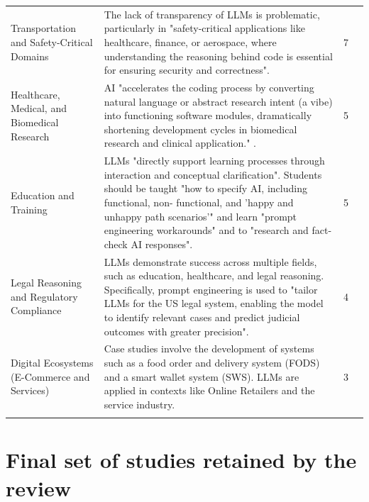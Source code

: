 {\begin{longtable}{>{\raggedright\arraybackslash} p{3cm} p{9.5cm} p{0.2cm} >{\raggedright\arraybackslash}p{1.5cm}}
Transportation and Safety-Critical Domains & The lack of transparency of LLMs is problematic, particularly in "safety-critical applications like healthcare, finance, or aerospace, where understanding the reasoning behind code is essential for ensuring security and correctness".\cite{Ahmed:2025ai} & 7 & \cite{Ahmed:2025ai, Haque:2025la, Basha:2025tt, Hemmat:2025rd, Wang:2025rs, Yoo:2025sa, Ramos:2025aa} \\ \addlinespace

Healthcare, Medical, and Biomedical Research & AI "accelerates the coding process by converting natural language or abstract research intent (a vibe) into functioning software modules, dramatically shortening development cycles in biomedical research and clinical application." \cite{Moore:2025vc}. & 5 & \cite{Moore:2025vc, Basha:2025tt, Hou:2025cl, Zhang:2025ea, Bai:2025ci} \\ \addlinespace

Education and Training & LLMs "directly support learning processes through interaction and conceptual clarification". Students should be taught "how to specify AI, including functional, non- functional, and 'happy and unhappy path scenarios'" and learn "prompt engineering workarounds" and to "research and fact- check AI responses". \cite{Ramos:2025aa} & 5 & \cite{Ramos:2025aa, Hemmat:2025rd, Zamfiroiu:2025ec, Zhang:2025ea, Hou:2025cl} \\ \addlinespace

Legal Reasoning and Regulatory Compliance & LLMs demonstrate success across multiple fields, such as education, healthcare, and legal reasoning. Specifically, prompt engineering is used to "tailor LLMs for the US legal system, enabling the model to identify relevant cases and predict judicial outcomes with greater precision". \cite{Jabrw:2025ss} & 4 &  \cite{Jabrw:2025ss, Bai:2025ci, Ramos:2025aa, AlHashimi:2025er} \\ \addlinespace

Digital Ecosystems (E-Commerce and Services) & Case studies involve the development of systems such as a food order and delivery system (FODS) and a smart wallet system (SWS). LLMs are applied in contexts like Online Retailers and the service industry. \cite{Kim:2025ao, Zhang:2025ea} & 3 & \cite{AlHashimi:2025er, Kim:2025ao, Zhang:2025ea} \\ \addlinespace

\end{longtable}
}

\section{Final set of studies retained by the review}
\label{sec:appA_corpus}

